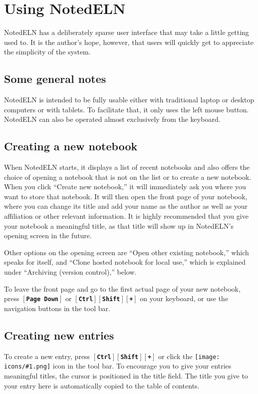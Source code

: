 \documentclass[11pt]{report}
\def\keystroke#1{$\left[\right.\!${\tt\bfseries #1}$\!\left.\right]$}
\def\key#1{\keystroke{#1}}
\def\controlshift#1{\keystroke{Ctrl}\keystroke{Shift}\keystroke{#1}}
\def\icon#1{\raise-2pt\hbox{\texttt{[image: icons/\#1.png]}}}
\begin{document}
\chapter{Using NotedELN}

NotedELN has a deliberately sparse user interface that may take a little
getting used to. It is the author's hope, however, that users will
quickly get to appreciate the simplicity of the system.

\section{Some general notes}

NotedELN is intended to be fully usable either with traditional laptop or
desktop computers or with tablets. To facilitate that, it only uses
the left mouse button. NotedELN can also be operated almost exclusively from the
keyboard.

\section{Creating a new notebook}

When NotedELN starts, it displays a list of recent notebooks and also offers the
choice of opening a notebook that is not on the list or to create a
new notebook. When you click ``Create new notebook,'' it will
immediately ask you where you want to store that notebook. It will
then open the front page of your notebook, where you can change its
title and add your name as the author as well as your affiliation or
other relevant information. It is highly recommended that you give
your notebook a meaningful title, as that title will show up in NotedELN's
opening screen in the future.

Other options on the opening screen are ``Open other existing
notebook,'' which speaks for itself, and ``Clone hosted notebook for
local use,'' which is explained under ``Archiving (version control),''
below.

To leave the front page and go to the first actual page of your new
notebook, press \key{Page Down} or \controlshift{+} on your keyboard,
or use the navigation buttons in the tool bar.

\section{Creating new entries}

To create a new entry, press \controlshift{+} or click the
\icon{nav-plus} icon in the tool bar. To encourage you to give
your entries meaningful titles, the cursor is positioned in the title
field. The title you give to your
entry here is automatically copied to the table of contents.
\end{document}
